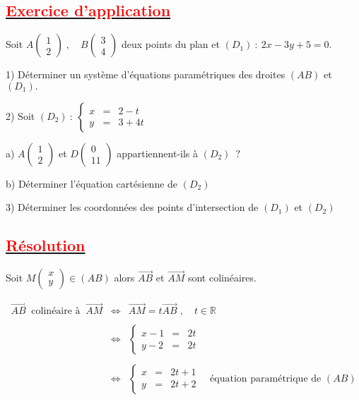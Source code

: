 \documentclass[12pt]{article}
\begin{document}
\subsection*{\underline{\textcolor{red}{\textbf{Exercice d'application}}}}
Soit $A\begin{pmatrix} 1 \\ 2\end{pmatrix}\;,\quad B\begin{pmatrix} 3 \\ 4\end{pmatrix}$ deux points du plan et $(D_{1})\ :\ 2x-3y+5=0.$

1) Déterminer un système d'équations paramétriques des droites $(AB)$ et $(D_{1}).$

2) Soit $(D_{2})\ :\ \left\lbrace\begin{array}{rcl} x&=&2-t \\ y&=&3+4t\end{array}\right.$

a) $A\begin{pmatrix} 1 \\ 2\end{pmatrix}$ et $D\begin{pmatrix} 0 \\ 11\end{pmatrix}$ appartiennent-ils à $(D_{2})\;\ ?$

b) Déterminer l'équation cartésienne de $(D_{2})$

3) Déterminer les coordonnées des points d'intersection de $(D_{1})$ et $(D_{2})$
\subsection*{\underline{\textcolor{red}{\textbf{Résolution}}}}
Soit $M\begin{pmatrix} x \\ y\end{pmatrix}\in(AB)$ alors $\overrightarrow{AB}$ et $\overrightarrow{AM}$ sont colinéaires.

$$\begin{array}{rcl} \overrightarrow{AB}\ \text{ colinéaire à }\ \overrightarrow{AM}&\Leftrightarrow&\overrightarrow{AM}=t\overrightarrow{AB}\;,\quad t\in\mathbb{R}\\ \\ &\Leftrightarrow&\left\lbrace\begin{array}{rcl} x-1&=&2t \\ y-2&=&2t \end{array}\right.\\ \\ &\Leftrightarrow&\left\lbrace\begin{array}{rcl} x&=&2t+1 \\ y&=&2t+2\end{array}\right.\quad\text{équation paramétrique de }(AB)\end{array}$$
\end{document}

